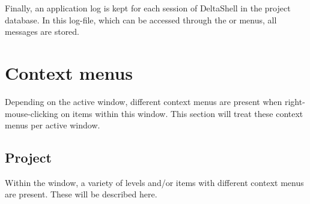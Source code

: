 Finally, an application log is kept for each session of DeltaShell in the project database. In this log-file, which can be accessed through the  or  menus, all messages are stored.



\section{Context menus}
\label{sec:contextmenus}
Depending on the active window, different context menus are present when right-mouse-clicking on items within this window. This section will treat these context menus per active window. 
%
\subsection{Project}
\label{subsec:project}
Within the  window, a variety of levels and/or items with different context menus are present. These will be described here. 
